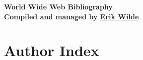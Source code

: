 \documentclass[10pt]{article}
\def\doctitle{World Wide Web Bibliography}
\def\docauthor{Erik Wilde}
\begin{document}
\begin{centering}
\vspace*{7mm}
{\huge\bf\doctitle}\\
\vspace*{7mm}
{\large\bf Compiled and managed by \href{http://dret.net/netdret/}{\docauthor}}\\
\vspace*{10mm}
\end{centering}

\nocite{*}

\def\authorstyle#1{{\sc #1}}




\renewcommand{\aipages}[1]{[{#1}]}
\section*{Author Index}

\begin{multicols}{2}
\printauthorindex
\end{multicols}
\end{document}
